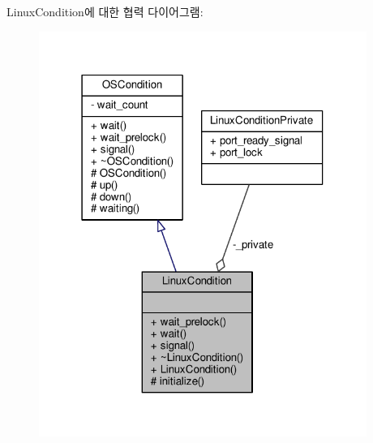 Linux\+Condition에 대한 협력 다이어그램\+:
\nopagebreak
\begin{figure}[H]
\begin{center}
\leavevmode
\includegraphics[width=303pt]{class_linux_condition__coll__graph}
\end{center}
\end{figure}
